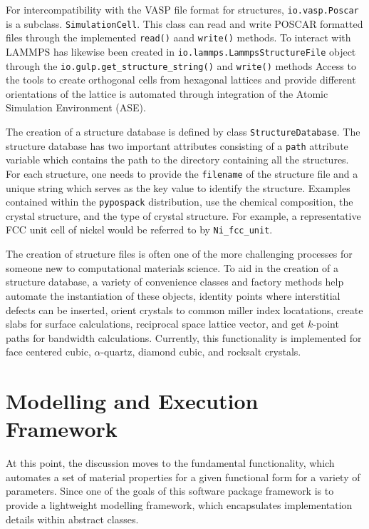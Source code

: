 For intercompatibility with the VASP file format for structures, \verb|io.vasp.Poscar| is a subclass. \verb|SimulationCell|.  This class can read and write POSCAR formatted files through the implemented \verb|read()| aand \verb|write()| methods.
To interact with LAMMPS has likewise been created in \verb|io.lammps.LammpsStructureFile| object through the \verb|io.gulp.get_structure_string()| and \verb|write()| methods
Access to the tools to create orthogonal cells from hexagonal lattices and provide different orientations of the lattice is automated through integration of the Atomic Simulation Environment (ASE)\cite{larsen2017_ase}.

The creation of a structure database is defined by class \verb|StructureDatabase|.  The structure database has two important attributes consisting of a \verb|path| attribute variable which contains the path to the directory containing all the structures.  For each structure, one needs to provide the \verb|filename| of the structure file and a unique string which serves as the key value to identify the structure.  Examples contained within the \verb|pypospack| distribution, use the chemical composition, the crystal structure, and the type of crystal structure.  For example, a representative FCC unit cell of nickel would be referred to by \verb|Ni_fcc_unit|.

The creation of structure files is often one of the more challenging processes for someone new to computational materials science.  To aid in the creation of a structure database, a variety of convenience classes and factory methods help automate the instantiation of these objects, identity points where interstitial defects can be inserted, orient crystals to common miller index locatations, create slabs for surface calculations, reciprocal space lattice vector, and get $k$-point paths for bandwidth calculations.  Currently, this functionality is implemented for face centered cubic, $\alpha$-quartz, diamond cubic, and rocksalt crystals.

\section{Modelling and Execution Framework}
\label{sec:potential_evalaution}

At this point, the discussion moves to the fundamental functionality, which automates a set of material properties for a given functional form for a variety of parameters.  Since one of the goals of this software package framework is to provide a lightweight modelling framework, which encapsulates implementation details within abstract classes.


